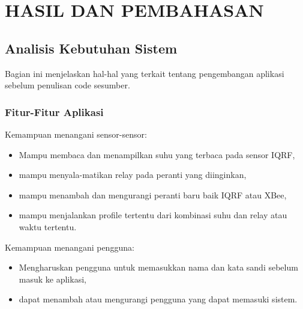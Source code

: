 
\chapter{HASIL DAN PEMBAHASAN}
	\section{Analisis Kebutuhan Sistem}
		Bagian ini menjelaskan hal-hal yang terkait tentang pengembangan aplikasi sebelum penulisan code sesumber.

		\subsection{Fitur-Fitur Aplikasi}
			Kemampuan menangani sensor-sensor:
			\begin{itemize}
				\item Mampu membaca dan menampilkan suhu yang terbaca pada sensor IQRF,
				\item mampu menyala-matikan relay pada peranti yang diinginkan,
				\item mampu menambah dan mengurangi peranti baru baik IQRF atau XBee,
				\item mampu menjalankan profile tertentu dari kombinasi suhu dan relay atau waktu tertentu.
			\end{itemize}

			Kemampuan menangani pengguna:
			\begin{itemize}
				\item Mengharuskan pengguna untuk memasukkan nama dan kata sandi sebelum masuk ke aplikasi,
				\item dapat menambah atau mengurangi pengguna yang dapat memasuki sistem.
			\end{itemize}

